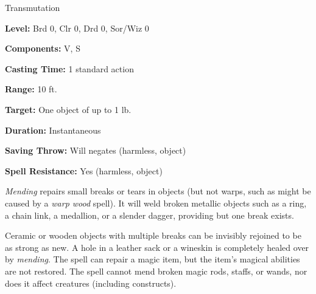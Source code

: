 
Transmutation

\textbf{Level:} Brd 0, Clr 0, Drd 0, Sor/Wiz 0

\textbf{Components:} V, S

\textbf{Casting Time:} 1 standard action

\textbf{Range:} 10 ft.

\textbf{Target:} One object of up to 1 lb.

\textbf{Duration:} Instantaneous

\textbf{Saving Throw:} Will negates (harmless, object)

\textbf{Spell Resistance:} Yes (harmless, object)

\textit{Mending} repairs small breaks or tears in objects (but not warps, such 
as might be caused by a \textit{warp wood} spell). It will weld broken metallic 
objects such as a ring, a chain link, a medallion, or a slender dagger, providing 
but one break exists.

Ceramic or wooden objects with multiple breaks can be invisibly rejoined to be 
as strong as new. A hole in a leather sack or a wineskin is completely healed over 
by \textit{mending}. The spell can repair a magic item, but the item's magical 
abilities are not restored. The spell cannot mend broken magic rods, staffs, or 
wands, nor does it affect creatures (including constructs).

